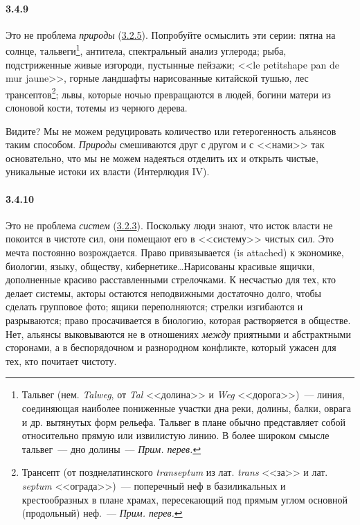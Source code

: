\paragraph{3.4.9}\hypertarget{par:3.4.9}{} Это не проблема {\itshape природы} (\hyperlink{par:3.2.5}{3.2.5}). Попробуйте осмыслить эти серии: пятна на солнце, тальвеги\footnote{Тальвег (нем. {\itshape Talweg}, от {\itshape Tal} <<долина>> и {\itshape Weg} <<дорога>>)~--- линия, соединяющая наиболее пониженные участки дна реки, долины, балки, оврага и др. вытянутых форм рельефа. Тальвег в плане обычно представляет собой относительно прямую или извилистую линию. В более широком смысле тальвег~--- дно долины~--- {\itshape Прим. перев.}}, антитела, спектральный анализ углерода; рыба, подстриженные живые изгороди, пустынные пейзажи; <<le petitshape pan de mur jaune>>, горные ландшафты нарисованные китайской тушью, лес трансептов\footnote{Трансепт (от позднелатинского {\itshape transeptum} из лат. {\itshape trans} <<за>> и лат. {\itshape septum} <<ограда>>)~--- поперечный неф в базиликальных и крестообразных в плане храмах, пересекающий под прямым углом основной (продольный) неф.~--- {\itshape Прим. перев.}}; львы, которые ночью превращаются в людей, богини матери из слоновой кости, тотемы из черного дерева.

Видите? Мы не можем редуцировать количество или гетерогенность альянсов таким способом. {\itshape Природы} смешиваются друг с другом и с <<нами>> так основательно, что мы не можем надеяться отделить их и открыть чистые, уникальные истоки их власти (Интерлюдия IV).

\paragraph{3.4.10}\hypertarget{par:3.4.10}{} Это не проблема {\itshape систем} (\hyperlink{par:3.2.3}{3.2.3}). Поскольку люди знают, что исток власти не покоится в чистоте сил, они помещают его в <<систему>> чистых сил. Это мечта постоянно возрождается. Право привязывается (is attached) к экономике, биологии, языку, обществу, кибернетике\ldots Нарисованы красивые ящички, дополненные красиво расставленными стрелочками. К несчастью для тех, кто делает системы, акторы остаются неподвижными достаточно долго, чтобы сделать групповое фото; ящики переполняются; стрелки изгибаются и разрываются; право просачивается в биологию, которая растворяется в обществе. Нет, альянсы выковываются не в отношениях {\itshape между} приятными и абстрактными сторонами, а в беспорядочном и разнородном конфликте, который ужасен для тех, кто почитает чистоту.

